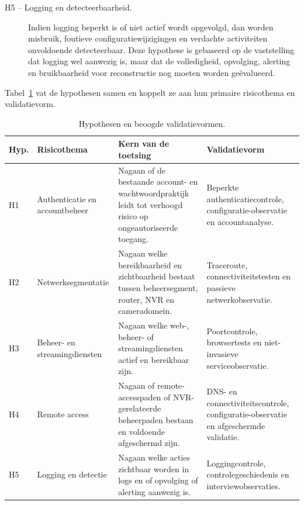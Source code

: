 \begin{description}
    \item[H5 -- Logging en detecteerbaarheid.]
    Indien logging beperkt is of niet actief wordt opgevolgd, dan worden misbruik, foutieve configuratiewijzigingen en verdachte activiteiten onvoldoende detecteerbaar. Deze hypothese is gebaseerd op de vaststelling dat logging wel aanwezig is, maar dat de volledigheid, opvolging, alerting en bruikbaarheid voor reconstructie nog moeten worden geëvalueerd.
\end{description}

Tabel~\ref{tab:hypothesen-validatie} vat de hypothesen samen en koppelt ze aan hun primaire risicothema en validatievorm.

\begin{table}[htbp]
    \centering
    \small
    \caption[Hypothesen en validatievormen]{Hypothesen en beoogde validatievormen.}
    \label{tab:hypothesen-validatie}
    {\setlength{\tabcolsep}{4pt}
        \begin{tabular}{p{}p{}p{}p{}}
            \hline
            \textbf{Hyp.} & \textbf{Risicothema} & \textbf{Kern van de toetsing} & \textbf{Validatievorm} \\
            \hline
            H1 & Authenticatie en accountbeheer & Nagaan of de bestaande account- en wachtwoordpraktijk leidt tot verhoogd risico op ongeautoriseerde toegang. & Beperkte authenticatiecontrole, configuratie-observatie en accountanalyse. \\
            \hline
            H2 & Netwerksegmentatie & Nagaan welke bereikbaarheid en zichtbaarheid bestaat tussen beheersegment, router, NVR en cameradomein. & Traceroute, connectiviteitstesten en passieve netwerkobservatie. \\
            \hline
            H3 & Beheer- en streamingdiensten & Nagaan welke web-, beheer- of streamingdiensten actief en bereikbaar zijn. & Poortcontrole, browsertests en niet-invasieve serviceobservatie. \\
            \hline
            H4 & Remote access & Nagaan of remote-accesspaden of NVR-gerelateerde beheerpaden bestaan en voldoende afgeschermd zijn. & DNS- en connectiviteitscontrole, configuratie-observatie en afgeschermde validatie. \\
            \hline
            H5 & Logging en detectie & Nagaan welke acties zichtbaar worden in logs en of opvolging of alerting aanwezig is. & Loggingcontrole, controlegeschiedenis en interviewobservaties. \\
            \hline
        \end{tabular}
    }
\end{table}

